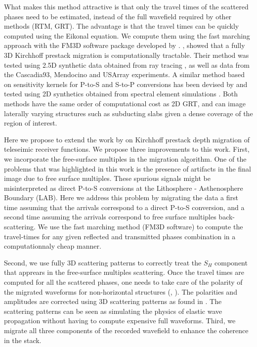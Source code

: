 \documentclass[9pt,a4paper]{article}
\numberwithin{equation}{section}
\begin{document}
\begin{multicols}{2}
What makes this method attractive is that only the travel times of the scattered phases need to be estimated, instead of the full wavefield required by other methods (RTM, GRT). 
The advantage is that the travel times can be quickly computed using the Eikonal equation. 
We compute them using the fast marching approach with the FM3D software package developed by \cite{deko_gji_06}.
\cite{cheng_gji_16}, \cite{cheng_grl_17} showed that a fully 3D Kirchhoff prestack migration is computationally tractable. 
Their method was tested using 2.5D synthetic data obtained from ray tracing \cite[Raysum,][]{fred_gji_00}, as well as data from the Cascadia93, Mendocino and USArray experiments.
A similar method based on sensitivity kernels for P-to-S and S-to-P conversions has been devised by \cite{hans_ggg_17} and tested using 2D synthetics obtained from spectral element simulations \cite[Specfem2D][]{trom_ccp_08}. 
Both methods have the same order of computational cost as 2D GRT, and can image laterally varying structures such as subducting slabs given a dense coverage of the region of interest.

Here we propose to extend the work by \cite{cheng_gji_16} on  Kirchhoff prestack depth migration of teleseimic receiver functions. 
We propose three improvements to this work.
First, we incorporate the free-surface multiples in the migration algorithm.
One of the problems that was highlighted in this work is the presence of artifacts in the final image due to free surface multiples. 
These spurious signals might be misinterpreted as direct P-to-S conversions at the Lithosphere - Asthenosphere Boundary (LAB). 
Here we address this problem by migrating the data a first time assuming that the arrivals correspond to a direct P-to-S conversion, and a second time assuming the arrivals correspond to free surface multiples back-scattering. 
We use the fast marching method (FM3D software) to compute the travel-times for any given reflected and transmitted phases combination in a computationnaly cheap manner.

Second, we use fully 3D scattering patterns to correctly treat the $S_H$ component that apprears in the free-surface multiples scattering.
Once the travel times are computed for all the scattered phases, one needs to take care of the polarity of the migrated waveforms for non-horizontal structures (\cite{tone_epsl_08}, \cite{cheng_gji_16}).
The polarities and amplitudes are corrected using 3D scattering patterns as found in \cite{beyl_wamo_90}.
The scattering patterns can be seen as simulating the physics of elastic wave propagation without having to compute expensive full waveforms.
Third, we migrate all three components of the recorded wavefield to enhance the coherence in the stack.


\end{multicols}
\end{document}
